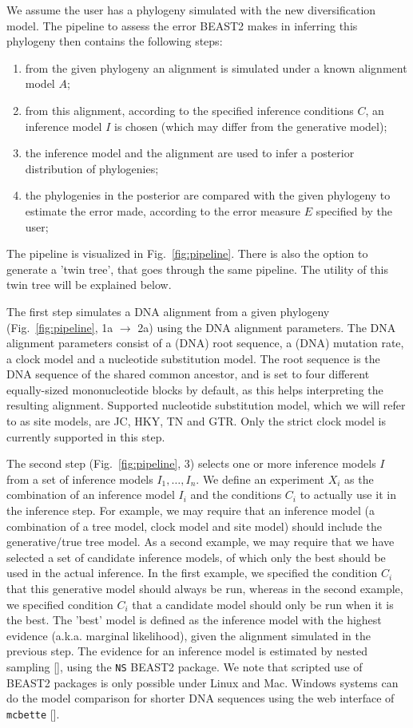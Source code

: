 We assume the user has a phylogeny simulated with the new diversification model. 
The pipeline to assess the error BEAST2 makes in inferring this phylogeny 
then contains the following steps:
\begin{enumerate}
  \item from the given phylogeny an alignment is simulated 
    under a known alignment model $\mathit{A}$;
  \item from this alignment, according to the specified 
    inference conditions $\mathit{C}$, 
    an inference model $\mathit{I}$ is chosen (which may differ from the 
    generative model);
  \item the inference model and the alignment are used 
    to infer a posterior distribution of phylogenies;
  \item the phylogenies in the posterior are compared with the given phylogeny 
    to estimate the error made, according to 
    the error measure $\mathit{E}$ specified by the user;
\end{enumerate}
The pipeline is visualized in Fig.~\ref{fig:pipeline}. 
There is also the option to generate a 'twin tree', 
that goes through the same pipeline. 
The utility of this twin tree will be explained below.

The first step simulates a DNA alignment from a given 
phylogeny (Fig.~\ref{fig:pipeline}, 1a $\rightarrow$ 2a)
using the DNA alignment parameters.
The DNA alignment parameters consist of 
a (DNA) root sequence, a (DNA) mutation rate, a clock model 
and a nucleotide substitution model.
The root sequence is the DNA sequence of the shared common ancestor,
and is set to four different equally-sized mononucleotide blocks by default, as this
helps interpreting the resulting alignment.
Supported nucleotide substitution model, which
we will refer to as site models, 
are JC, HKY, TN and GTR. Only the strict
clock model is currently supported in this step.

The second step (Fig.~\ref{fig:pipeline}, 3)
selects one or more inference models $I$ from a set of inference 
models $I_{1},\dots,I_{n}$. 
We define an experiment $X_{i}$ as the combination of 
an inference model $I_{i}$ and the conditions $C_{i}$ 
to actually use it in the inference step.
For example, we may require that an inference
model (a combination of a tree model, clock model and site model) 
should include the generative/true tree model. 
As a second example, we may require that we have selected a set of 
candidate inference models,
of which only the best should be used in the actual inference.
In the first example, we specified the condition $C_{i}$ that this
generative model should always be run, whereas in the second example,
we specified condition $C_{i}$ that a candidate model should only be run
when it is the best.
The 'best' model is defined as the inference model with
the highest evidence (a.k.a. marginal likelihood), given the alignment 
simulated in the previous step.
The evidence for an inference model is estimated by nested 
sampling [\cite{maturana2018model}], using the \verb;NS; BEAST2 package. 
We note that scripted use of BEAST2 packages is only possible under Linux and Mac.
Windows systems can do the model comparison for shorter DNA sequences 
using the web interface of \verb;mcbette; [\cite{mcbette}].

